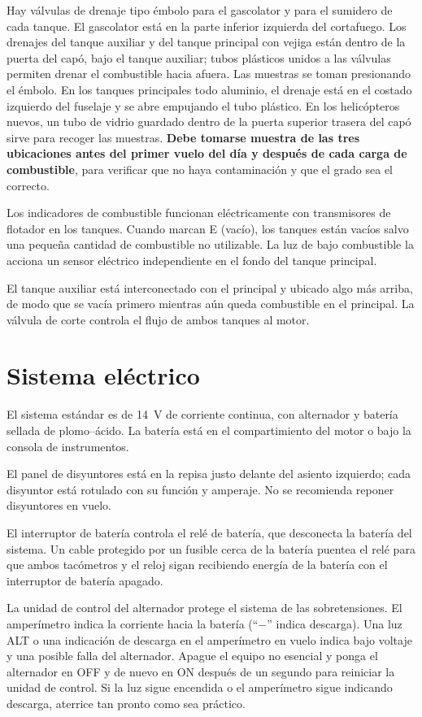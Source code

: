 Hay válvulas de drenaje tipo émbolo para el gascolator y para el sumidero de cada tanque. El gascolator está en la parte inferior izquierda del cortafuego. Los drenajes del tanque auxiliar y del tanque principal con vejiga están dentro de la puerta del capó, bajo el tanque auxiliar; tubos plásticos unidos a las válvulas permiten drenar el combustible hacia afuera. Las muestras se toman presionando el émbolo. En los tanques principales todo aluminio, el drenaje está en el costado izquierdo del fuselaje y se abre empujando el tubo plástico. En los helicópteros nuevos, un tubo de vidrio guardado dentro de la puerta superior trasera del capó sirve para recoger las muestras. \textbf{Debe tomarse muestra de las tres ubicaciones antes del primer vuelo del día y después de cada carga de combustible}, para verificar que no haya contaminación y que el grado sea el correcto.

Los indicadores de combustible funcionan eléctricamente con transmisores de flotador en los tanques. Cuando marcan E (vacío), los tanques están vacíos salvo una pequeña cantidad de combustible no utilizable. La luz de bajo combustible la acciona un sensor eléctrico independiente en el fondo del tanque principal.

El tanque auxiliar está interconectado con el principal y ubicado algo más arriba, de modo que se vacía primero mientras aún queda combustible en el principal. La válvula de corte controla el flujo de ambos tanques al motor.

\section{Sistema eléctrico}

El sistema estándar es de 14~V de corriente continua, con alternador y batería sellada de plomo--ácido. La batería está en el compartimiento del motor o bajo la consola de instrumentos.

El panel de disyuntores está en la repisa justo delante del asiento izquierdo; cada disyuntor está rotulado con su función y amperaje. No se recomienda reponer disyuntores en vuelo.

El interruptor de batería controla el relé de batería, que desconecta la batería del sistema. Un cable protegido por un fusible cerca de la batería puentea el relé para que ambos tacómetros y el reloj sigan recibiendo energía de la batería con el interruptor de batería apagado.

La unidad de control del alternador protege el sistema de las sobretensiones. El amperímetro indica la corriente hacia la batería (``$-$'' indica descarga). Una luz \textsf{ALT} o una indicación de descarga en el amperímetro en vuelo indica bajo voltaje y una posible falla del alternador. Apague el equipo no esencial y ponga el alternador en OFF y de nuevo en ON después de un segundo para reiniciar la unidad de control. Si la luz sigue encendida o el amperímetro sigue indicando descarga, aterrice tan pronto como sea práctico.

